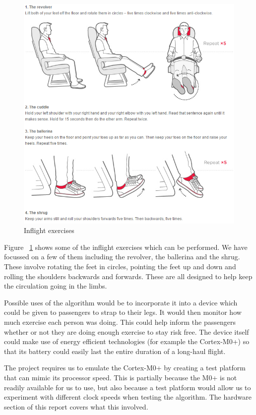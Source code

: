 \begin{figure}[h]
  \centering
    \includegraphics[width=1.0\textwidth]{figures/exercises}
  \caption{Inflight exercises \cite{virgin2015exercises}}
  \label{fig:exercises}
\end{figure}

Figure ~\ref{fig:exercises} shows some of the inflight exercises which can be performed. We have focussed on a few of them including the revolver, the ballerina and the shrug. These involve rotating the feet in circles, pointing the feet up and down and rolling the shoulders backwards and forwards. These are all designed to help keep the circulation going in the limbs.

Possible uses of the algorithm would be to incorporate it into a device which could be given to passengers to strap to their legs. It would then monitor how much exercise each person was doing. This could help inform the passengers whether or not they are doing enough exercise to stay risk free. The device itself could make use of energy efficient technologies (for example the Cortex-M0+) so that its battery could easily last the entire duration of a long-haul flight.

The project requires us to emulate the Cortex-M0+ by creating a test platform that can mimic its processor speed. This is partially because the M0+ is not readily available for us to use, but also because a test platform would allow us to experiment with different clock speeds when testing the algorithm. The hardware section of this report covers what this involved.

